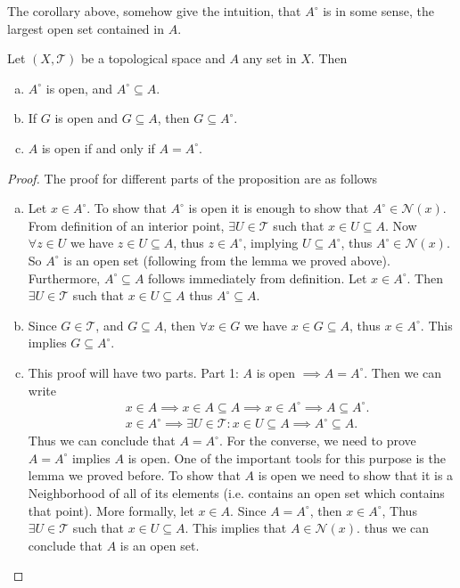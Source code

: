 The corollary above, somehow give the intuition, that $A^\circ$ is in some sense, the largest open set contained in $A$.


\begin{propbox}
	Let $(X,\mathcal{T})$ be a topological space and $A$ any set in $X$. Then 
	\begin{enumerate}[(a)]
		\item $A^\circ$ is open, and $A^\circ \subseteq A$.
		\item If $G$ is open and $G \subseteq A$, then $G \subseteq A^\circ$.
		\item $A$ is open if and only if $A = A^\circ$.
	\end{enumerate}
\end{propbox}
\begin{proof}
	The proof for different parts of the proposition are as follows
	\begin{enumerate}[(a)]
		\item Let $x\in A^\circ$. To show that $A^\circ$ is open it is enough to show that $A^\circ \in \mathcal{N}(x)$. From definition of an interior point, $\exists U \in \mathcal{T}$ such that $x\in U \subseteq A$. Now $\forall z\in U$ we have $z\in U \subseteq A$, thus $z\in A^\circ$, implying $U\subseteq A^\circ$, thus $A^\circ \in \mathcal{N}(x)$. So $A^\circ$ is an open set (following from the lemma we proved above). Furthermore, $A^\circ \subseteq A$ follows immediately from definition. Let $x\in A^\circ$. Then $\exists U \in \mathcal{T}$ such that $x \in U \subseteq A$ thus $A^\circ \subseteq A$.
		\item Since $G \in \mathcal{T}$, and $G\subseteq A$, then $\forall x\in G$ we have $x\in G \subseteq A$, thus $x \in A^\circ$. This implies $G \subseteq A^\circ$.
		
		\item This proof will have two parts. Part 1: $A$ is open $\implies A = A^\circ$. Then we can write
		\begin{align*}
			& x \in A \implies x \in A \subseteq A \implies x \in A^\circ \implies A \subseteq A^\circ. \\
			& x \in A^\circ \implies \exists U \in \mathcal{T}: x \in U \subseteq A \implies A^\circ \subseteq A.
		\end{align*} 
		Thus we can conclude that $A = A^\circ$. For the converse, we need to prove $A=A^\circ$ implies $A$ is open. One of the important tools for this purpose is the lemma we proved before. To show that $A$ is open we need to show that it is a Neighborhood of all of its elements (i.e. contains an open set which contains that point). More formally, let $x\in A$. Since $A = A^\circ$, then $x \in A^\circ$, Thus $\exists U \in \mathcal{T}$ such that $x \in U \subseteq A$. This implies that $A \in \mathcal{N}(x)$. thus we can conclude that $A$ is an open set.
	\end{enumerate}
\end{proof}


